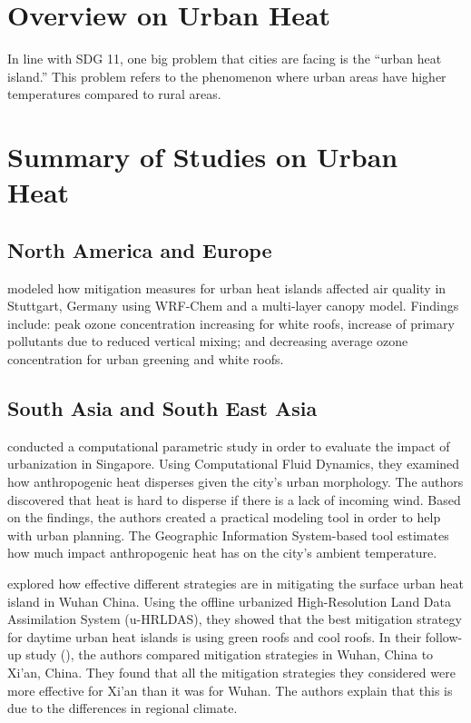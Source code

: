 \section{Overview on Urban Heat}
	
	In line with SDG 11, one big problem that cities are facing is the ``urban heat island.'' 
	This problem refers to the phenomenon where urban areas have higher temperatures compared to rural areas.
	
	

\section{Summary of Studies on Urban Heat}	
	\subsection{North America and Europe}
		\textcite{Fallmann2016} modeled how mitigation measures for urban heat islands affected air quality in Stuttgart, Germany using WRF-Chem and a multi-layer canopy model. Findings include: 
			peak ozone concentration increasing for white roofs, 
			increase of primary pollutants due to reduced vertical mixing; and 
			decreasing average ozone concentration for urban greening and white roofs.
		
		
		
	\subsection{South Asia and South East Asia}
		\textcite{Yuan2020} conducted a computational parametric study in order to evaluate the impact of urbanization in Singapore.
		Using Computational Fluid Dynamics, they examined how anthropogenic heat disperses given the city's urban morphology.
		The authors discovered that heat is hard to disperse if there is a lack of incoming wind.
		Based on the findings, the authors created a practical modeling tool in order to help with urban planning. 
		The Geographic Information System-based tool estimates how much impact anthropogenic heat has on the city's ambient temperature.
		
		\textcite{Gao2019} explored how effective different strategies are in mitigating the surface urban heat island in Wuhan China.
		Using the offline urbanized High-Resolution Land Data Assimilation System (u-HRLDAS), they showed that the best mitigation strategy for daytime urban heat islands is using green roofs and cool roofs.
		In their follow-up study (\cite{Gao2020}), the authors compared mitigation strategies in Wuhan, China to Xi'an, China.
		They found that all the mitigation strategies they considered were more effective for Xi'an than it was for Wuhan. 
		The authors explain that this is due to the differences in regional climate.
		
